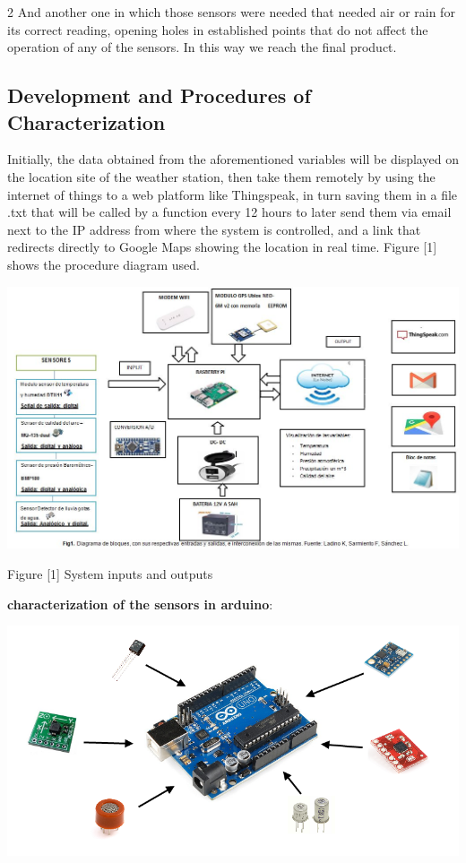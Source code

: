 \documentclass{article}
\begin{document}
\begin{multicols} {2}
And another one in which those sensors were needed that needed air or rain for its correct reading, opening holes in established points that do not affect the operation of any of the sensors. In this way we reach the final product.

\subsection{Development and Procedures of
Characterization}

Initially, the data obtained from the aforementioned variables will be displayed on the location site of the weather station, then take them remotely by using the internet of things to a web platform like Thingspeak, in turn saving them in a file .txt that will be called by a function every 12 hours to later send them via email next to the IP address from where the system is controlled, and a link that redirects directly to Google Maps showing the location in real time. Figure [1] shows the procedure diagram used.


\begin{center}
\includegraphics[scale=0.2]{Captura.JPG}
\caption{Figure [1] System inputs and outputs}
\end{center}

\textbf{characterization of the sensors in arduino}:

\includegraphics[scale=0.2]{arduino.png}


\end{multicols}
\end{document}

